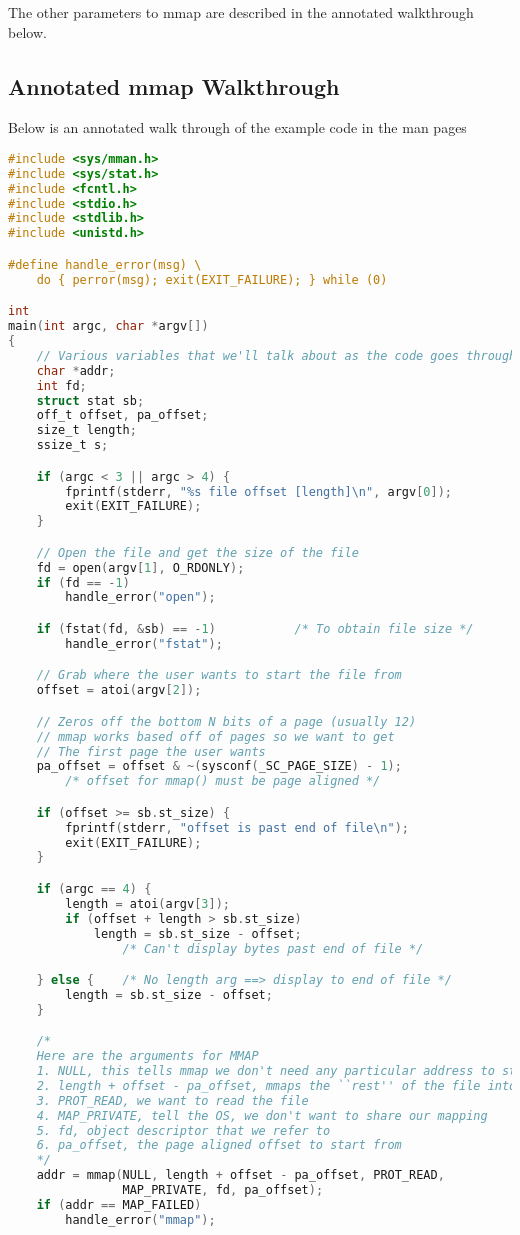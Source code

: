 The other parameters to mmap are described in the annotated walkthrough below.

\subsection{Annotated mmap Walkthrough}

Below is an annotated walk through of the example code in the man pages

\begin{lstlisting}[language=C]
#include <sys/mman.h>
#include <sys/stat.h>
#include <fcntl.h>
#include <stdio.h>
#include <stdlib.h>
#include <unistd.h>

#define handle_error(msg) \
    do { perror(msg); exit(EXIT_FAILURE); } while (0)

int
main(int argc, char *argv[])
{
    // Various variables that we'll talk about as the code goes through
    char *addr;
    int fd;
    struct stat sb;
    off_t offset, pa_offset;
    size_t length;
    ssize_t s;

    if (argc < 3 || argc > 4) {
        fprintf(stderr, "%s file offset [length]\n", argv[0]);
        exit(EXIT_FAILURE);
    }

    // Open the file and get the size of the file
    fd = open(argv[1], O_RDONLY);
    if (fd == -1)
        handle_error("open");

    if (fstat(fd, &sb) == -1)           /* To obtain file size */
        handle_error("fstat");

    // Grab where the user wants to start the file from
    offset = atoi(argv[2]);

    // Zeros off the bottom N bits of a page (usually 12)
    // mmap works based off of pages so we want to get
    // The first page the user wants
    pa_offset = offset & ~(sysconf(_SC_PAGE_SIZE) - 1);
        /* offset for mmap() must be page aligned */

    if (offset >= sb.st_size) {
        fprintf(stderr, "offset is past end of file\n");
        exit(EXIT_FAILURE);
    }

    if (argc == 4) {
        length = atoi(argv[3]);
        if (offset + length > sb.st_size)
            length = sb.st_size - offset;
                /* Can't display bytes past end of file */

    } else {    /* No length arg ==> display to end of file */
        length = sb.st_size - offset;
    }

    /*
    Here are the arguments for MMAP
    1. NULL, this tells mmap we don't need any particular address to start from
    2. length + offset - pa_offset, mmaps the ``rest'' of the file into memory (starting form offset)
    3. PROT_READ, we want to read the file
    4. MAP_PRIVATE, tell the OS, we don't want to share our mapping
    5. fd, object descriptor that we refer to
    6. pa_offset, the page aligned offset to start from
    */
    addr = mmap(NULL, length + offset - pa_offset, PROT_READ,
                MAP_PRIVATE, fd, pa_offset);
    if (addr == MAP_FAILED)
        handle_error("mmap");


\end{lstlisting}
